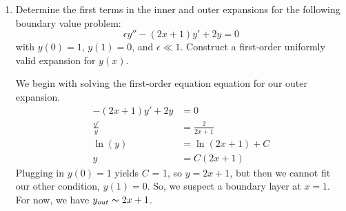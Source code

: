 \documentclass[10pt,letterpaper]{report}
\begin{document}
\begin{enumerate}
\item \begin{qbox}
Determine the first terms in the inner and outer expansions for the following boundary value problem:
\[
\epsilon y'' - (2x + 1)y' + 2y = 0
\]
with $y(0) = 1$, $y(1) = 0$, and $\epsilon \ll 1$. Construct a first-order uniformly valid expansion for $y(x)$.
\end{qbox}

We begin with solving the first-order equation equation for our outer expansion.
\begin{align*}
    -(2x + 1)y' + 2y &= 0
    \\
    \frac{y'}{y} &= \frac{2}{2x+1}
    \\
    \ln(y) &= \ln(2x + 1) + C
    \\
    y &= C(2x + 1)
\end{align*}
Plugging in $y(0) = 1$ yields $C$ = 1, so $y = 2x + 1$, but then we cannot fit our other condition, $y(1) = 0$. So, we suspect a boundary layer at $x = 1$. For now, we have $y_{out} \thicksim 2x + 1$.


\end{enumerate}
\end{document}
